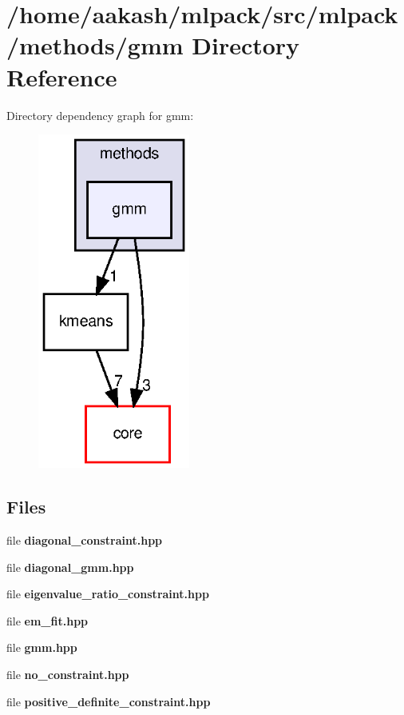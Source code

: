 \section{/home/aakash/mlpack/src/mlpack/methods/gmm Directory Reference}
\label{dir_8736a0c763d9f23987032ed3e2a224d2}
Directory dependency graph for gmm\+:
\nopagebreak
\begin{figure}[H]
\begin{center}
\leavevmode
\includegraphics[width=142pt]{dir_8736a0c763d9f23987032ed3e2a224d2_dep}
\end{center}
\end{figure}
\subsection*{Files}
\begin{DoxyCompactItemize}
\item 
file \textbf{ diagonal\+\_\+constraint.\+hpp}
\item 
file \textbf{ diagonal\+\_\+gmm.\+hpp}
\item 
file \textbf{ eigenvalue\+\_\+ratio\+\_\+constraint.\+hpp}
\item 
file \textbf{ em\+\_\+fit.\+hpp}
\item 
file \textbf{ gmm.\+hpp}
\item 
file \textbf{ no\+\_\+constraint.\+hpp}
\item 
file \textbf{ positive\+\_\+definite\+\_\+constraint.\+hpp}
\end{DoxyCompactItemize}
